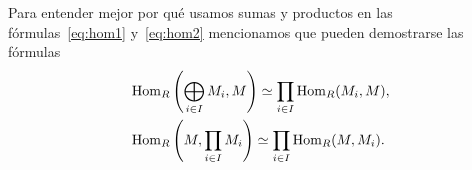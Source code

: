 Para entender mejor por qué usamos sumas y productos en las fórmulas~\eqref{eq:hom1} y~\eqref{eq:hom2} 
mencionamos que pueden demostrarse las fórmulas  
\begin{align*}
&\operatorname{Hom}_R\left(\bigoplus_{i\in I}M_i,M\right)\simeq \prod_{i\in I}\operatorname{Hom}_R(M_i,M),\\
&\operatorname{Hom}_R\left(M,\prod_{i\in I}M_i\right)\simeq \prod_{i\in I}\operatorname{Hom}_R(M,M_i).	
\end{align*}



